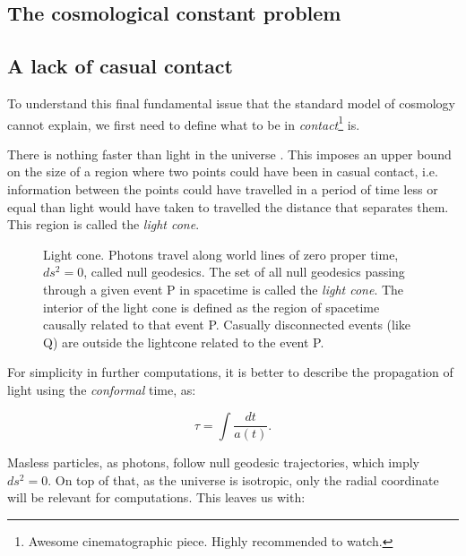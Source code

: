 \documentclass[11pt, a4paper]{article} %
\begin{document}
\subsection*{The cosmological constant problem}

\subsection*{A lack of casual contact}

To understand this final fundamental issue that the standard model of cosmology cannot explain, we first need to define what to be in \textit{contact}\footnote{Awesome cinematographic piece. Highly recommended to watch.} is.

There is nothing faster than light in the universe \cite{}. This imposes an upper bound on the size of a region where two points could have been in casual contact, i.e. information between the points could have travelled in a period of time less or equal than light would have taken to travelled the distance that separates them. This region is called the \textit{light cone}.
\vspace{0.5cm} %
\begin{figure}[h]
    \centering
    
	\caption{Light cone. Photons travel along world lines of zero proper time, $ds^{2} = 0$, called null geodesics. The set of all null geodesics passing through a given event P in spacetime is called the \textit{light cone}. The interior of the light cone is defined as the region of spacetime causally related to that event P. Casually disconnected events (like Q) are outside the lightcone related to the event P.}
	\label{Fig: light_cone}
\end{figure}

For simplicity in further computations, it is better to describe the propagation of light using the \textit{conformal} time, as:

\begin{equation}
	\tau = \int \frac{dt}{a(t)}.
\end{equation}

Masless particles, as photons, follow null geodesic trajectories, which imply $ds^{2} = 0$. On top of that, as the universe is isotropic, only the radial coordinate will be relevant for computations. This leaves us with:
\end{document}
